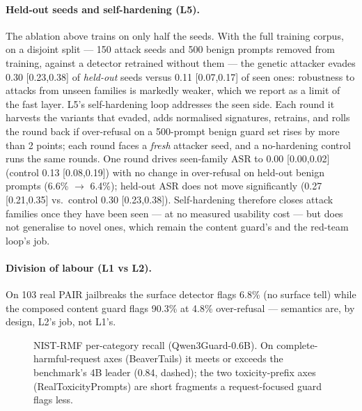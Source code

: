 \documentclass[11pt]{article}
\begin{document}
\paragraph{Held-out seeds and self-hardening (L5).} The ablation above trains on only half the seeds. With
the full training corpus, on a disjoint split --- 150 attack seeds and 500 benign prompts removed from
training, against a detector retrained without them --- the genetic attacker evades 0.30 [0.23,0.38] of
\emph{held-out} seeds versus 0.11 [0.07,0.17] of seen ones: robustness to attacks from unseen families is
markedly weaker, which we report as a limit of the fast layer. L5's self-hardening loop addresses the
seen side. Each round it harvests the variants that evaded, adds normalised signatures, retrains, and rolls
the round back if over-refusal on a 500-prompt benign guard set rises by more than 2 points; each round
faces a \emph{fresh} attacker seed, and a no-hardening control runs the same rounds. One round drives
seen-family ASR to 0.00 [0.00,0.02] (control 0.13 [0.08,0.19]) with no change in over-refusal on held-out
benign prompts (6.6\% $\rightarrow$ 6.4\%); held-out ASR does not move significantly (0.27 [0.21,0.35]
vs.\ control 0.30 [0.23,0.38]). Self-hardening therefore closes attack families once they have been seen
--- at no measured usability cost --- but does not generalise to novel ones, which remain the content
guard's and the red-team loop's job.

\paragraph{Division of labour (L1 vs L2).} On 103 real PAIR jailbreaks the surface detector flags
6.8\% (no surface tell) while the composed content guard flags 90.3\% at 4.8\% over-refusal ---
semantics are, by design, L2's job, not L1's.

\begin{figure}[t]
\centering
{}
\caption{NIST-RMF per-category recall (Qwen3Guard-0.6B). On complete-harmful-request axes
(BeaverTails) it meets or exceeds the benchmark's 4B leader (0.84, dashed); the two toxicity-prefix
axes (RealToxicityPrompts) are short fragments a request-focused guard flags less.}
\label{fig:nist}
\end{figure}
\end{document}
